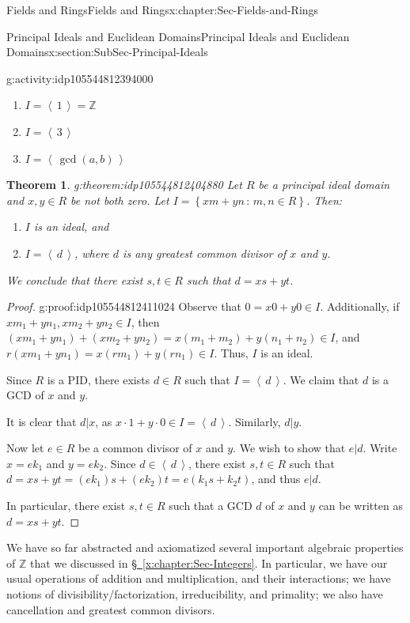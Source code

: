 \documentclass[oneside,10pt,]{book}
\newcommand{\xreffont}{\relax}
\numberwithin{equation}{section}
\newcommand{\ideal}[1]{\left\langle\, #1 \,\right\rangle}
\newcommand{\setof}[2]{{\left\{#1\,\colon\,#2\right\}}}
\def\Z{{\mathbb Z}}
\newtheorem{theorem}{Theorem}[section]
\begin{document}
\begin{chapterptx}{Fields and Rings}{}{Fields and Rings}{}{}{x:chapter:Sec-Fields-and-Rings}
\begin{sectionptx}{Principal Ideals and Euclidean Domains}{}{Principal Ideals and Euclidean Domains}{}{}{x:section:SubSec-Principal-Ideals}
\begin{activity}{}{g:activity:idp105544812394000}
\begin{enumerate}
\item{}\(\displaystyle I = \ideal{1} = \Z\)%
\item{}\(\displaystyle I = \ideal{3}\)%
\item{}\(\displaystyle I = \ideal{\gcd(a,b)}\)%
\end{enumerate}
%
\end{activity}%
\begin{theorem}{}{}{g:theorem:idp105544812404880}%
Let \(R\) be a principal ideal domain and \(x,y\in R\) be not both zero. Let \(I = \setof{xm+yn}{m,n\in R}\). Then:%
\begin{enumerate}
\item{}\(I\) is an ideal, and%
\item{}\(I = \ideal{d}\), where \(d\) is any greatest common divisor of \(x\) and \(y\).%
\end{enumerate}
%
\par
We conclude that there exist \(s,t\in R\) such that \(d = xs + yt\).%
\end{theorem}
\begin{proof}{}{g:proof:idp105544812411024}
Observe that \(0 = x0 + y0 \in I\). Additionally, if \(x m_1 + y n_1, x m_2 + y n_2\in I\), then \((x m_1 + y n_1) + (x m_2 + y n_2) = x (m_1 + m_2) + y (n_1 + n_2) \in I\), and \(r(x m_1 + y n_1) = x (rm_1) + y(rn_1) \in I\). Thus, \(I\) is an ideal.%
\par
Since \(R\) is a PID, there exists \(d\in R\) such that \(I = \ideal{d}\). We claim that \(d\) is a GCD of \(x\) and \(y\).%
\par
It is clear that \(d|x\), as \(x\cdot 1 + y\cdot 0\in I = \ideal{d}\). Similarly, \(d|y\).%
\par
Now let \(e\in R\) be a common divisor of \(x\) and \(y\). We wish to show that \(e|d\). Write \(x = e k_1\) and \(y = e k_2\). Since \(d\in \ideal{d}\), there exist \(s,t\in R\) such that \(d = x s + yt = (e k_1) s + (e k_2)t = e(k_1 s + k_2 t)\), and thus \(e|d\).%
\par
In particular, there exist \(s,t\in R\) such that a GCD \(d\) of \(x\) and \(y\) can be written as \(d = xs + yt\).%
\end{proof}
We have so far abstracted and axiomatized several important algebraic properties of \(\Z\) that we discussed in \hyperref[x:chapter:Sec-Integers]{§~{\xreffont\ref{x:chapter:Sec-Integers}}}. In particular, we have our usual operations of addition and multiplication, and their interactions; we have notions of divisibility\slash{}factorization, irreducibility, and primality; we also have cancellation and greatest common divisors.%

\end{sectionptx}
\end{chapterptx}
\end{document}
